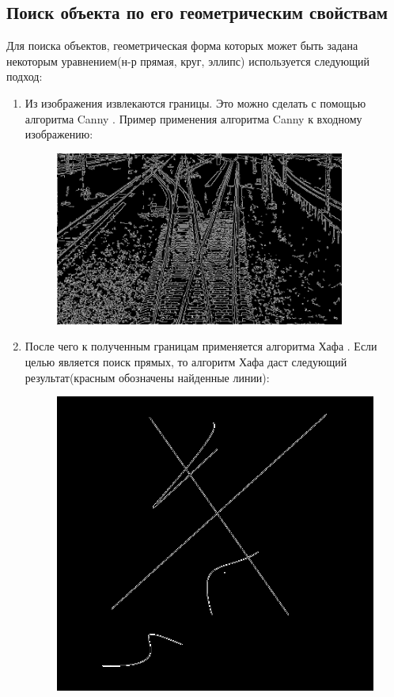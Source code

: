 \subsection{Поиск объекта по его геометрическим свойствам}
Для поиска объектов, геометрическая форма которых может быть задана некоторым уравнением(н-р прямая, круг, эллипс) используется следующий подход:
\begin{enumerate}
	\item Из изображения извлекаются границы. Это можно сделать с помощью алгоритма Canny \cite{b:canny}. \newline
	Пример применения алгоритма Canny к входному изображению:
	\begin{figure}[!h]
		\centering
		\includegraphics[width=0.9\textwidth]{pictures/canny_res}
		\caption[Применение алгоритма Canny]{}
		\label{fig:cannyres}
	\end{figure}
	\item После чего к полученным границам применяется алгоритма Хафа \cite{b:hough_transform}. Если целью является поиск прямых, то алгоритм Хафа даст следующий результат(красным обозначены найденные линии):
	\begin{figure}[!h]
		\centering
		\begin{minipage}{0.45\textwidth}
			\centering
			\includegraphics[width=0.7\linewidth]{pictures/canny_ex}

\end{minipage}
\end{figure}
\end{enumerate}
